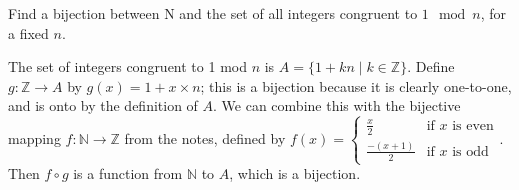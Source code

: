 \question Find a bijection between N and the set of all integers 
congruent to $1 \mod n$, for a fixed $n$.
\begin{solution} [2 mm]
The set of integers congruent to 1 mod $n$ is $A = \{1 + kn \mid k \in \mathbb{Z}\}$. 
Define $g : \mathbb{Z} \to A$ by $g(x) = 1 + x \times n$; this is a bijection 
because it is clearly one-to-one, and is onto by the definition of $A$. 
We can combine this with the bijective mapping $f : \mathbb{N} \to \mathbb{Z}$ from the 
notes, defined by
$f(x) = \begin{cases}
\frac{x}{2} & \text{if $x$ is even} \\ 
\frac{-(x + 1)}{2} & \text{if $x$ is odd}
\end{cases}$.
Then $f \circ g$ is a function from $\mathbb{N}$ to $A$, which is a bijection.
\end{solution}